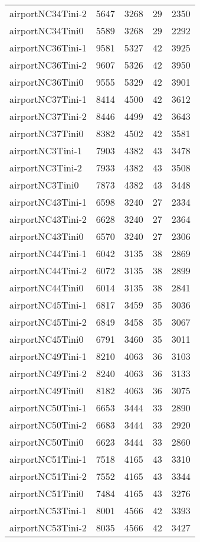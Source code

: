 \begin{longtable}{lrrrr}
airportNC34Tini-2 & 5647 & 3268 & 29 & 2350 \\
airportNC34Tini0 & 5589 & 3268 & 29 & 2292 \\
airportNC36Tini-1 & 9581 & 5327 & 42 & 3925 \\
airportNC36Tini-2 & 9607 & 5326 & 42 & 3950 \\
airportNC36Tini0 & 9555 & 5329 & 42 & 3901 \\
airportNC37Tini-1 & 8414 & 4500 & 42 & 3612 \\
airportNC37Tini-2 & 8446 & 4499 & 42 & 3643 \\
airportNC37Tini0 & 8382 & 4502 & 42 & 3581 \\
airportNC3Tini-1 & 7903 & 4382 & 43 & 3478 \\
airportNC3Tini-2 & 7933 & 4382 & 43 & 3508 \\
airportNC3Tini0 & 7873 & 4382 & 43 & 3448 \\
airportNC43Tini-1 & 6598 & 3240 & 27 & 2334 \\
airportNC43Tini-2 & 6628 & 3240 & 27 & 2364 \\
airportNC43Tini0 & 6570 & 3240 & 27 & 2306 \\
airportNC44Tini-1 & 6042 & 3135 & 38 & 2869 \\
airportNC44Tini-2 & 6072 & 3135 & 38 & 2899 \\
airportNC44Tini0 & 6014 & 3135 & 38 & 2841 \\
airportNC45Tini-1 & 6817 & 3459 & 35 & 3036 \\
airportNC45Tini-2 & 6849 & 3458 & 35 & 3067 \\
airportNC45Tini0 & 6791 & 3460 & 35 & 3011 \\
airportNC49Tini-1 & 8210 & 4063 & 36 & 3103 \\
airportNC49Tini-2 & 8240 & 4063 & 36 & 3133 \\
airportNC49Tini0 & 8182 & 4063 & 36 & 3075 \\
airportNC50Tini-1 & 6653 & 3444 & 33 & 2890 \\
airportNC50Tini-2 & 6683 & 3444 & 33 & 2920 \\
airportNC50Tini0 & 6623 & 3444 & 33 & 2860 \\
airportNC51Tini-1 & 7518 & 4165 & 43 & 3310 \\
airportNC51Tini-2 & 7552 & 4165 & 43 & 3344 \\
airportNC51Tini0 & 7484 & 4165 & 43 & 3276 \\
airportNC53Tini-1 & 8001 & 4566 & 42 & 3393 \\
airportNC53Tini-2 & 8035 & 4566 & 42 & 3427 \\

\end{longtable}
